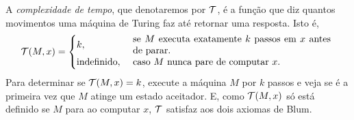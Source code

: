 \begin{example}
    A \emph{complexidade de tempo},
    que denotaremos por ${\mathcal{T}}$,
    é a função que diz quantos movimentos
    uma máquina de Turing faz até retornar uma resposta.
    Isto é,
    \begin{equation*}
        \PhiDT(M, x) = \begin{cases}
            k, & \text{
                \parbox{0.6\textwidth}{
                    se $M$ executa exatamente $k$ passos em $x$ antes de parar.
                }
            } \\
            \text{indefinido}, & \text{
                \parbox{0.6\textwidth}{
                    caso $M$ nunca pare de computar $x$.
                }
            }
        \end{cases}
    \end{equation*}
    Para determinar se ${\mathcal{T}}(M, x) = k$,
    execute a máquina $M$ por $k$ passos
    e veja se é a primeira vez que
    $M$ atinge um estado aceitador.
    E, como ${\mathcal{T}}(M, x)$ só está definido se $M$ para ao computar $x$,
    ${\mathcal{T}}$ satisfaz aos dois axiomas de Blum.
\end{example}


